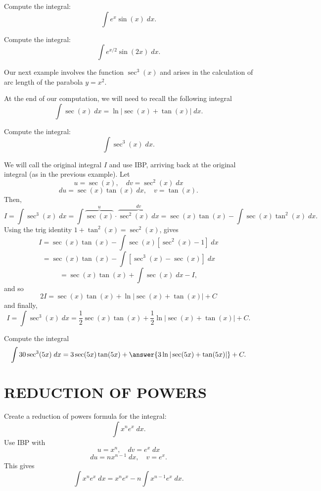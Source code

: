 \documentclass{ximera}
\begin{document}
\begin{problem}
Compute the integral:
\[
\int e^x\sin(x) \; dx.
\]
\end{problem}


\begin{problem}
Compute the integral:
\[
\int e^{x/2}\sin(2x) \; dx.
\]
\end{problem}

Our next example involves the function $\sec^3(x)$ and arises in the calculation of arc length 
of the parabola $y = x^2$.

At the end of our computation, we will need to recall the following integral
\[
\int \sec(x) \; dx = \ln|\sec(x) + \tan(x)| \; dx.
\]

\begin{example}
Compute the integral:
\[
\int \sec^3(x) \; dx.
\]

We will call the original integral $I$ and use IBP, arriving back at the original integral (as in the previous example).
Let
\[
u = \sec(x), \quad dv = \sec^2(x) \; dx
\]
\[
du = \sec(x)\tan(x) \; dx, \quad v = \tan(x).
\]
Then,
\[
I = \int \sec^3(x) \; dx = \int \overbrace{\sec(x)}^u \cdot \overbrace{\sec^2(x) \; dx}^{dv} = \sec(x) \tan(x) - \int \sec(x) \tan^2(x) \; dx.
\]
Using the trig identity $1 + \tan^2(x) = \sec^2(x)$, gives
\[
I = \sec(x) \tan(x) - \int \sec(x) [\sec^2(x) -1] \; dx
\]
\[
=\sec(x) \tan(x) - \int  [\sec^3(x) -\sec(x)] \; dx 
\]
\[
= \sec(x) \tan(x) + \int \sec(x)\; dx -I,
\]
and so
\[
2I = \sec(x) \tan(x) + \ln|\sec(x) + \tan(x)| + C
\]
and finally,
\[
I = \int \sec^3(x) \; dx = \frac12 \sec(x) \tan(x) + \frac12 \ln|\sec(x) + \tan(x)| + C.
\]
\end{example}

\begin{problem}
Compute the integral
\[
\int 30\sec^3(5x) \; dx = 3\sec(5x) \tan(5x) +  \answer{3\ln|\sec(5x) + \tan(5x)|} + C.
\]
\end{problem}


\section{REDUCTION OF POWERS}


\begin{example}
Create a reduction of powers formula for the integral:
\[
\int x^n e^x \; dx.
\]
Use IBP with
\[
u = x^n, \quad dv = e^x \; dx
\]
\[
du = nx^{n-1}\; dx,  \quad v = e^x.
\]
This gives
\[
\int x^n e^x \; dx = x^n e^x - n\int x^{n-1} e^x \; dx.
\]
\end{example}
\end{document}
